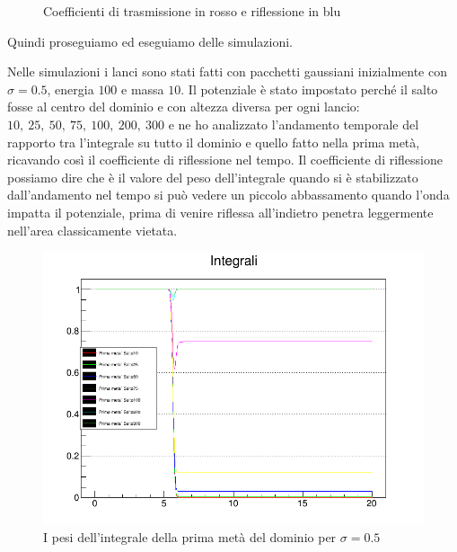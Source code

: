 \begin{figure}[hbt]
	\centering
	\caption{Coefficienti di trasmissione in rosso e riflessione in blu}
\end{figure}

Quindi proseguiamo ed eseguiamo delle simulazioni.

Nelle simulazioni i lanci sono stati fatti con pacchetti gaussiani inizialmente con $\sigma=0.5$, energia $100$ e massa $10$. Il potenziale \`e stato impostato perch\'e il salto fosse al centro del dominio e con altezza diversa per ogni lancio: $10,\ 25,\ 50,\ 75,\ 100,\ 200,\ 300$ e ne ho analizzato l'andamento temporale del rapporto tra l'integrale su tutto il dominio e quello fatto nella prima met\`a, ricavando cos\`i il coefficiente di riflessione nel tempo. Il coefficiente di riflessione possiamo dire che \`e il valore del peso dell'integrale quando si \`e stabilizzato dall'andamento nel tempo si pu\`o vedere un piccolo abbassamento quando l'onda impatta il potenziale, prima di venire riflessa all'indietro penetra leggermente nell'area classicamente vietata.

\begin{figure}[tbh]
\centering
\includegraphics[width=0.7\linewidth]{IMG/SaltoR}
\caption{I pesi dell'integrale della prima met\`a del dominio per $\sigma=0.5$}\label{fig:SaltoR}
\end{figure}


